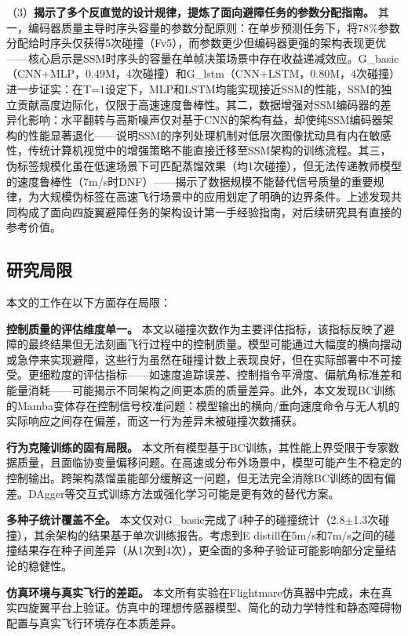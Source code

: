 \documentclass[12pt,a4paper]{article}
\numberwithin{equation}{section}
\numberwithin{figure}{section}
\numberwithin{table}{section}
\begin{document}
（3）\textbf{揭示了多个反直觉的设计规律，提炼了面向避障任务的参数分配指南。} 其一，编码器质量主导时序头容量的参数分配原则：在单步预测任务下，将78\%参数分配给时序头仅获得5次碰撞（Fv5），而参数更少但编码器更强的架构表现更优——核心启示是SSM时序头的容量在单帧决策场景中存在收益递减效应。G\_basic（CNN+MLP，0.49M，4次碰撞）和G\_lstm（CNN+LSTM，0.80M，4次碰撞）进一步证实：在T=1设定下，MLP和LSTM均能实现接近SSM的性能，SSM的独立贡献高度边际化，仅限于高速速度鲁棒性。其二，数据增强对SSM编码器的差异化影响：水平翻转与高斯噪声仅对基于CNN的架构有益，却使纯SSM编码器架构的性能显著退化——说明SSM的序列处理机制对低层次图像扰动具有内在敏感性，传统计算机视觉中的增强策略不能直接迁移至SSM架构的训练流程。其三，伪标签规模化虽在低速场景下可匹配蒸馏效果（均1次碰撞），但无法传递教师模型的速度鲁棒性（7m/s时DNF）——揭示了数据规模不能替代信号质量的重要规律，为大规模伪标签在高速飞行场景中的应用划定了明确的边界条件。上述发现共同构成了面向四旋翼避障任务的架构设计第一手经验指南，对后续研究具有直接的参考价值。

\subsection{研究局限}

本文的工作在以下方面存在局限：

\textbf{控制质量的评估维度单一。} 本文以碰撞次数作为主要评估指标，该指标反映了避障的最终结果但无法刻画飞行过程中的控制质量。模型可能通过大幅度的横向摆动或急停来实现避障，这些行为虽然在碰撞计数上表现良好，但在实际部署中不可接受。更细粒度的评估指标——如速度追踪误差、控制指令平滑度、偏航角标准差和能量消耗——可能揭示不同架构之间更本质的质量差异。此外，本文发现BC训练的Mamba变体存在控制信号校准问题：模型输出的横向/垂向速度命令与无人机的实际响应之间存在偏差，而这一行为差异未被碰撞次数捕获。

\textbf{行为克隆训练的固有局限。} 本文所有模型基于BC训练，其性能上界受限于专家数据质量，且面临协变量偏移问题。在高速或分布外场景中，模型可能产生不稳定的控制输出。跨架构蒸馏虽能部分缓解这一问题，但无法完全消除BC训练的固有偏差。DAgger等交互式训练方法或强化学习可能是更有效的替代方案。

\textbf{多种子统计覆盖不全。} 本文仅对G\_basic完成了4种子的碰撞统计（2.8$\pm$1.3次碰撞），其余架构的结果基于单次训练报告。考虑到E distill在5m/s和7m/s之间的碰撞结果存在种子间差异（从1次到4次），更全面的多种子验证可能影响部分定量结论的稳健性。

\textbf{仿真环境与真实飞行的差距。} 本文所有实验在Flightmare仿真器中完成，未在真实四旋翼平台上验证。仿真中的理想传感器模型、简化的动力学特性和静态障碍物配置与真实飞行环境存在本质差异。
\end{document}

